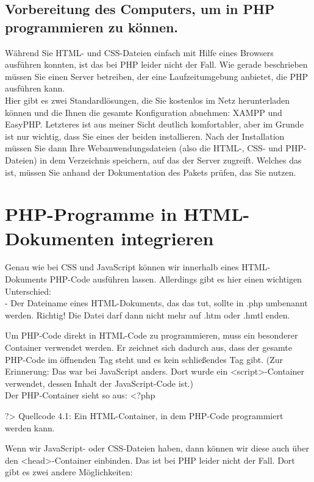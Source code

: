 \subsection{Vorbereitung des Computers, um in PHP programmieren zu können.}

Während Sie HTML- und CSS-Dateien einfach mit Hilfe eines Browsers ausführen konnten, ist das bei PHP leider nicht der Fall. Wie gerade beschrieben müssen Sie einen Server betreiben, der eine Laufzeitumgebung anbietet, die PHP ausführen kann.\\


Hier gibt es zwei Standardlösungen, die Sie kostenlos im Netz herunterladen können und die Ihnen die gesamte Konfiguration abnehmen: XAMPP und EasyPHP. Letzteres ist aus meiner Sicht deutlich komfortabler, aber im Grunde ist nur wichtig, dass Sie eines der beiden installieren. Nach der Installation müssen Sie dann Ihre Webanwendungsdateien (also die HTML-, CSS- und PHP-Dateien) in dem Verzeichnis speichern, auf das der Server zugreift. Welches das ist, müssen Sie anhand der Dokumentation des Pakets prüfen, das Sie nutzen.

\section{PHP-Programme in HTML-Dokumenten integrieren}

Genau wie bei CSS und JavaScript können wir innerhalb eines HTML-Dokuments PHP-Code ausführen lassen. Allerdings gibt es hier einen wichtigen Unterschied: \\


-	Der Dateiname eines HTML-Dokuments, das das tut, sollte in .php umbenannt werden. Richtig! Die Datei darf dann nicht mehr auf .htm oder .hmtl enden.

Um PHP-Code direkt in HTML-Code zu programmieren, muss ein besonderer Container verwendet werden. Er zeichnet sich dadurch aus, dass der gesamte PHP-Code im öffnenden Tag steht und es kein schließendes Tag gibt. (Zur Erinnerung: Das war bei JavaScript anders. Dort wurde ein <script>-Container verwendet, dessen Inhalt der JavaScript-Code ist.)\\

Der PHP-Container sieht so aus:
<?php

?>
Quellcode 4.1: Ein HTML-Container, in dem PHP-Code programmiert werden kann.

Wenn wir JavaScript- oder CSS-Dateien haben, dann können wir diese auch über den <head>-Container einbinden. Das ist bei PHP leider nicht der Fall. Dort gibt es zwei andere Möglichkeiten:\\


